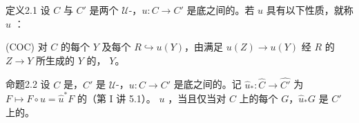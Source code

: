 \begin{SGAresult}{定义}{2.1}
设 $C$ 与 $C'$ 是两个 $\mathcal U$-，$u:C\to C'$ 是底之间的。若 $u$ 具有以下性质，就称 $u$ ：

\noindent (COC) 对 $C$ 的每个 $Y$ 及每个 $R\hookrightarrow u(Y)$，由满足 $u(Z)\to u(Y)$ 经 $R$ 的 $Z\to Y$ 所生成的 $Y$ 的， $Y$。
\end{SGAresult}

\begin{SGAresult}{命题}{2.2}
设 $C$ 是，$C'$ 是 $\mathcal U$-，$u:C\to C'$ 是底之间的。记 $\widehat u_*:\widehat C\to\widehat {C'}$ 为 $F\mapsto F\circ u=\widehat u^*F$ 的（第 I 讲 5.1）。 $u$ ，当且仅当对 $C$ 上的每个 $G$，$\widehat u_*G$ 是 $C'$ 上的。
\end{SGAresult}
